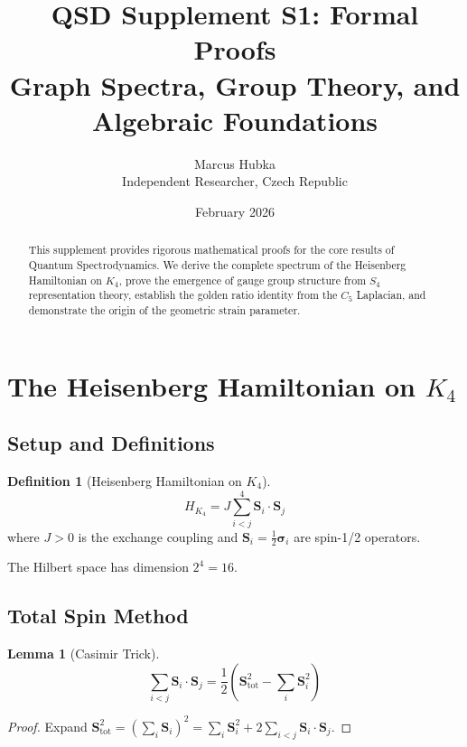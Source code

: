 \documentclass[11pt,a4paper]{article}
\title{\textbf{QSD Supplement S1: Formal Proofs}\\[0.5em]
\large Graph Spectra, Group Theory, and Algebraic Foundations}
\author{Marcus Hubka\\
\small Independent Researcher, Czech Republic}
\date{February 2026}
\newtheorem{lemma}[theorem]{Lemma}
\theoremstyle{definition}
\newtheorem{definition}[theorem]{Definition}
\begin{document}
\maketitle

\begin{abstract}
This supplement provides rigorous mathematical proofs for the core results of Quantum Spectrodynamics. We derive the complete spectrum of the Heisenberg Hamiltonian on $K_4$, prove the emergence of gauge group structure from $S_4$ representation theory, establish the golden ratio identity from the $C_5$ Laplacian, and demonstrate the origin of the geometric strain parameter.
\end{abstract}

\tableofcontents

\section{The Heisenberg Hamiltonian on $K_4$}

\subsection{Setup and Definitions}

\begin{definition}[Heisenberg Hamiltonian on $K_4$]
\begin{equation}
H_{K_4} = J \sum_{i<j}^{4} \mathbf{S}_i \cdot \mathbf{S}_j
\end{equation}
where $J > 0$ is the exchange coupling and $\mathbf{S}_i = \frac{1}{2}\boldsymbol{\sigma}_i$ are spin-1/2 operators.
\end{definition}

The Hilbert space has dimension $2^4 = 16$.

\subsection{Total Spin Method}

\begin{lemma}[Casimir Trick]
\begin{equation}
\sum_{i<j} \mathbf{S}_i \cdot \mathbf{S}_j = \frac{1}{2}\left( \mathbf{S}_{\text{tot}}^2 - \sum_i \mathbf{S}_i^2 \right)
\end{equation}
\end{lemma}

\begin{proof}
Expand $\mathbf{S}_{\text{tot}}^2 = (\sum_i \mathbf{S}_i)^2 = \sum_i \mathbf{S}_i^2 + 2\sum_{i<j} \mathbf{S}_i \cdot \mathbf{S}_j$.
\end{proof}
\end{document}
